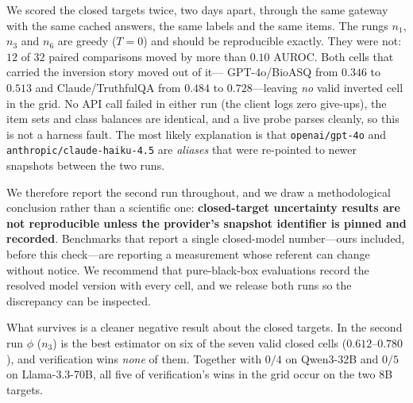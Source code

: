 \documentclass[11pt]{article}
\begin{document}
We scored the closed targets twice, two days apart, through the same gateway with the same cached
answers, the same labels and the same items. The rungs $n_1$, $n_3$ and $n_6$ are greedy
($T{=}0$) and should be reproducible exactly. They were not: $12$ of $32$ paired comparisons
moved by more than $0.10$ AUROC. Both cells that carried the inversion story moved out of it---
GPT-4o/BioASQ from $0.346$ to $0.513$ and Claude/TruthfulQA from $0.484$ to $0.728$---leaving
\emph{no} valid inverted cell in the grid. No API call failed in either run (the client logs zero
give-ups), the item sets and class balances are identical, and a live probe parses cleanly, so
this is not a harness fault. The most likely explanation is that \texttt{openai/gpt-4o} and
\texttt{anthropic/claude-haiku-4.5} are \emph{aliases} that were re-pointed to newer snapshots
between the two runs.

We therefore report the second run throughout, and we draw a methodological conclusion rather
than a scientific one: \textbf{closed-target uncertainty results are not reproducible unless the
provider's snapshot identifier is pinned and recorded}. Benchmarks that report a single
closed-model number---ours included, before this check---are reporting a measurement whose
referent can change without notice. We recommend that pure-black-box evaluations record the
resolved model version with every cell, and we release both runs so the discrepancy can be
inspected.

What survives is a cleaner negative result about the closed targets. In the second run
$\phi$ ($n_3$) is the best estimator on six of the seven valid closed cells ($0.612$--$0.780$),
and verification wins \emph{none} of them. Together with $0/4$ on Qwen3-32B and $0/5$ on
Llama-3.3-70B, all five of verification's wins in the grid occur on the two 8B targets.
\end{document}
